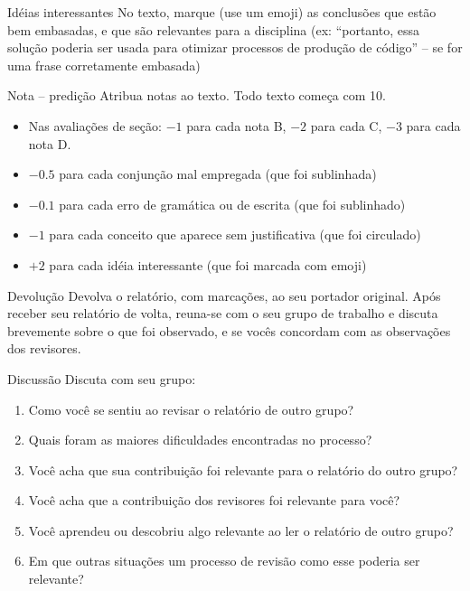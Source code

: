 \documentclass{beamer}
\begin{document}
\begin{frame}[fragile]{Idéias interessantes}
  \centering
  \large
  No texto, marque (use um emoji) as conclusões que estão bem embasadas, e que
  são relevantes para a disciplina (ex: ``portanto, essa solução poderia ser
  usada para otimizar processos de produção de código'' -- se for uma frase
  corretamente embasada)
\end{frame}

\begin{frame}[fragile]{Nota -- predição}
  \centering
  \large
  Atribua notas ao texto. Todo texto começa com 10.
  \begin{itemize}
    \item Nas avaliações de seção: $-1$ para cada nota B, $-2$ para cada C, $-3$ para
  cada nota D.
    \item $-0.5$ para cada conjunção mal empregada (que foi sublinhada)
    \item $-0.1$ para cada erro de gramática ou de escrita (que foi sublinhado)
    \item $-1$ para cada conceito que aparece sem justificativa (que foi circulado)
    \item $+2$ para cada idéia interessante (que foi marcada com emoji)
  \end{itemize}
\end{frame}

\begin{frame}[fragile]{Devolução}
  \centering
  \large
  Devolva o relatório, com marcações, ao seu portador original. Após receber seu
  relatório de volta, reuna-se com o seu grupo de trabalho e discuta brevemente
  sobre o que foi observado, e se vocês concordam com as observações dos
  revisores.
\end{frame}

\begin{frame}[fragile]{Discussão}
  \centering
  \large
  Discuta com seu grupo:
  \begin{enumerate}
    \item Como você se sentiu ao revisar o relatório de outro grupo?
    \item Quais foram as maiores dificuldades encontradas no processo?
    \item Você acha que sua contribuição foi relevante para o relatório do outro
      grupo?
    \item Você acha que a contribuição dos revisores foi relevante para você?
    \item Você aprendeu ou descobriu algo relevante ao ler o relatório de outro
      grupo?
    \item Em que outras situações um processo de revisão como esse poderia ser
      relevante?
  \end{enumerate}
\end{frame}
\end{document}
